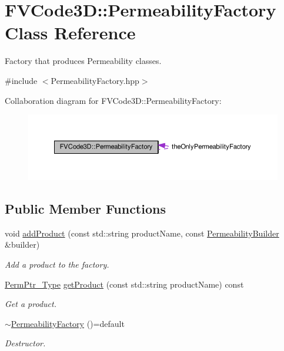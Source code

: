 \hypertarget{classFVCode3D_1_1PermeabilityFactory}{}\section{F\+V\+Code3D\+:\+:Permeability\+Factory Class Reference}
\label{classFVCode3D_1_1PermeabilityFactory}


Factory that produces Permeability classes.  




{\ttfamily \#include $<$Permeability\+Factory.\+hpp$>$}



Collaboration diagram for F\+V\+Code3D\+:\+:Permeability\+Factory\+:
\nopagebreak
\begin{figure}[H]
\begin{center}
\leavevmode
\includegraphics[width=350pt]{classFVCode3D_1_1PermeabilityFactory__coll__graph}
\end{center}
\end{figure}
\subsection*{Public Member Functions}
\begin{DoxyCompactItemize}
\item 
void \hyperlink{classFVCode3D_1_1PermeabilityFactory_a3a160511216d3258029df8b84a7c322d}{add\+Product} (const std\+::string product\+Name, const \hyperlink{namespaceFVCode3D_ad92e05ac4c0491bab1c45e5457d2518c}{Permeability\+Builder} \&builder)
\begin{DoxyCompactList}\small\item\em Add a product to the factory. \end{DoxyCompactList}\item 
\hyperlink{namespaceFVCode3D_aee5ae48a57366603109f90f526a645b1}{Perm\+Ptr\+\_\+\+Type} \hyperlink{classFVCode3D_1_1PermeabilityFactory_a1cba6a88ecaaf1c152877ab632381010}{get\+Product} (const std\+::string product\+Name) const 
\begin{DoxyCompactList}\small\item\em Get a product. \end{DoxyCompactList}\item 
\hyperlink{classFVCode3D_1_1PermeabilityFactory_a6cb7bab1a4ce9d2711e68222b6471ab4}{$\sim$\+Permeability\+Factory} ()=default
\begin{DoxyCompactList}\small\item\em Destructor. \end{DoxyCompactList}\end{DoxyCompactItemize}
